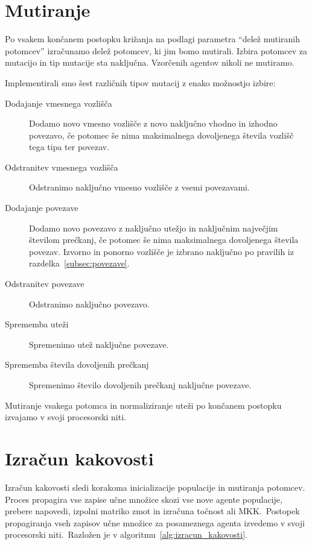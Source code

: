 \documentclass[a4paper,12pt,openright]{book}
\begin{document}
    \section{Mutiranje}\label{sec:mutiranje}
    Po vsakem končanem postopku križanja na podlagi parametra \enquote{delež mutiranih potomcev} izračunamo delež potomcev,
    ki jim bomo mutirali.
    Izbira potomcev za mutacijo in tip mutacije sta naključna.
    Vzorčenih agentov nikoli ne mutiramo.

    Implementirali smo šest različnih tipov mutacij z enako možnostjo izbire:
    \begin{description}
        \item[Dodajanje vmesnega vozlišča]{Dodamo novo vmesno vozlišče z novo na\-klju\-čno vhodno in izhodno povezavo, če
        potomec še nima maksimalnega dovoljenega števila vozlišč tega tipa ter povezav.}
        \item[Odstranitev vmesnega vozlišča]{Odstranimo naključno vmesno vozlišče z vsemi povezavami.}
        \item[Dodajanje povezave]{Dodamo novo povezavo z naključno utežjo in naključnim največjim
        številom prečkanj, če potomec še nima maksimalnega dovoljenega števila povezav. Izvorno in ponorno vozlišče je
        izbrano naključno po pravilih iz razdelka~\ref{subsec:povezave}. }
        \item[Odstranitev povezave]{Odstranimo naključno povezavo.}
        \item[Sprememba uteži]{Spremenimo utež naključne povezave.}
        \item[Sprememba števila dovoljenih prečkanj]{Spremenimo šte\-vi\-lo dovoljenih prečkanj naključne povezave.}
    \end{description}

    Mutiranje vsakega potomca in normaliziranje uteži po končanem postopku izvajamo v svoji procesorski niti.


    \section{Izračun kakovosti}\label{sec:izracun-kakovosti}
    Izračun kakovosti sledi korakoma inicializacije populacije in mutiranja potomcev.
    Proces propagira vse zapise učne množice skozi vse nove agente populacije, prebere napovedi,
    izpolni matriko zmot in izračuna točnost ali MKK.\ Postopek propagiranja vseh zapisov učne množice za posameznega agenta izvedemo v svoji
    procesorski niti.\ Razložen je v algoritmu~\ref{alg:izracun_kakovosti}.
\end{document}

